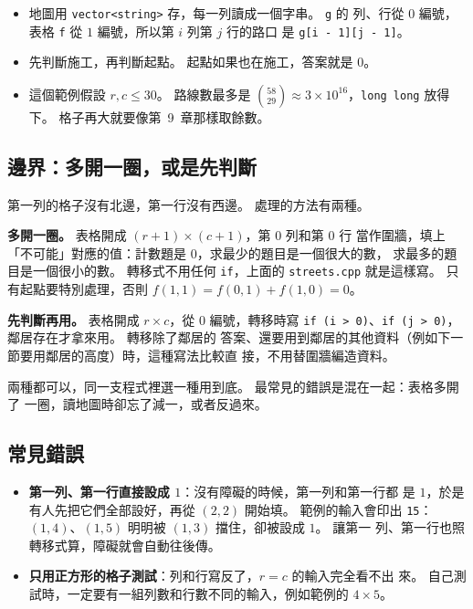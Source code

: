 \begin{itemize}
\item 地圖用 \texttt{vector<string>} 存，每一列讀成一個字串。 \texttt{g} 的
列、行從 $0$ 編號，表格 \texttt{f} 從 $1$ 編號，所以第 $i$ 列第 $j$ 行的路口
是 \texttt{g[i - 1][j - 1]}。
\item 先判斷施工，再判斷起點。 起點如果也在施工，答案就是 $0$。
\item 這個範例假設 $r, c \le 30$。 路線數最多是 $\binom{58}{29} \approx 3
\times 10^{16}$，\texttt{long long} 放得下。 格子再大就要像第~9~章那樣取餘數。
\end{itemize}

\subsection{邊界：多開一圈，或是先判斷}
\label{sec:dp2-border}

第一列的格子沒有北邊，第一行沒有西邊。 處理的方法有兩種。

\textbf{多開一圈。} 表格開成 $(r + 1) \times (c + 1)$，第 $0$ 列和第 $0$ 行
當作圍牆，填上「不可能」對應的值：計數題是 $0$，求最少的題目是一個很大的數，
求最多的題目是一個很小的數。 轉移式不用任何 \texttt{if}，上面的
\texttt{streets.cpp} 就是這樣寫。 只有起點要特別處理，否則
$f(1, 1) = f(0, 1) + f(1, 0) = 0$。

\textbf{先判斷再用。} 表格開成 $r \times c$，從 $0$ 編號，轉移時寫
\texttt{if (i > 0)}、\texttt{if (j > 0)}，鄰居存在才拿來用。 轉移除了鄰居的
答案、還要用到鄰居的其他資料（例如下一節要用鄰居的高度）時，這種寫法比較直
接，不用替圍牆編造資料。

兩種都可以，同一支程式裡選一種用到底。 最常見的錯誤是混在一起：表格多開了
一圈，讀地圖時卻忘了減一，或者反過來。

\subsection{常見錯誤}

\begin{itemize}
\item \textbf{第一列、第一行直接設成 $1$}：沒有障礙的時候，第一列和第一行都
是 $1$，於是有人先把它們全部設好，再從 $(2, 2)$ 開始填。 範例的輸入會印出
\texttt{15}：$(1, 4)$、$(1, 5)$ 明明被 $(1, 3)$ 擋住，卻被設成 $1$。 讓第一
列、第一行也照轉移式算，障礙就會自動往後傳。
\item \textbf{只用正方形的格子測試}：列和行寫反了，$r = c$ 的輸入完全看不出
來。 自己測試時，一定要有一組列數和行數不同的輸入，例如範例的 $4 \times 5$。
\end{itemize}

